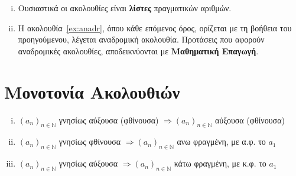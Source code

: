 \documentclass[main.tex]{subfiles}
\begin{document}
\begin{rem}
\item {}
  \begin{enumerate}[i)]
    \item Ουσιαστικά οι ακολουθίες είναι \textbf{λίστες} πραγματικών αριθμών.
    \item Η ακολουθία~\ref{ex:anadr}, όπου κάθε επόμενος όρος,
      ορίζεται με τη βοήθεια του προηγούμενου, λέγεται
      \textcolor{Col\thechapter}{αναδρομική ακολουθία}. 
      Προτάσεις που αφορούν αναδρομικές ακολουθίες, 
      αποδεικνύονται με \textbf{Μαθηματική Επαγωγή}.
  \end{enumerate}
\end{rem}




\section{Μονοτονία Ακολουθιών}


\begin{rems}
\item {}
  \begin{enumerate}[i)]
    \item $ (a_{n})_{n \in \mathbb{N}} $ γνησίως αύξουσα (φθίνουσα) $ 
      \Rightarrow (a_{n})_{n \in \mathbb{N}} $ αύξουσα (φθίνουσα) 
    \item $ (a_{n})_{n \in \mathbb{N}} $ γνησίως φθίνουσα  $ 
      \Rightarrow (a_{n})_{n \in \mathbb{N}} $ ανω φραγμένη, με 
      α.φ. το $ a_{1} $  
    \item $ (a_{n})_{n \in \mathbb{N}} $ γνησίως αύξουσα  $ 
      \Rightarrow (a_{n})_{n \in \mathbb{N}} $ κάτω φραγμένη, με 
      κ.φ. το $ a_{1} $  
  \end{enumerate}
\end{rems}
\end{document}

